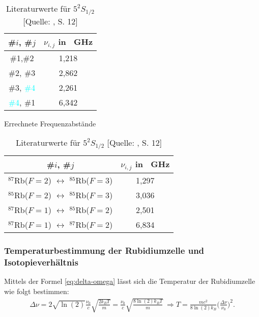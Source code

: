 \begin{table}[!h]
\begin{minipage}{7cm}
    \centering
    \begin{tabular}{|c|c|}
        \hline
        \#$i$, \#$j$       &       $\nu_{i,j}$ in \SI{}{\giga \hertz}      \\ 
        \hline
        \hline
        \textcolor{red!80!black}{\#1},\textcolor{green!50!black}{\#2}       &       1,218        \\  
        \hline
        \textcolor{green!50!black}{\#2}, \textcolor{pink!50!purple}{\#3}    &       2,862        \\ 
        \hline
        \textcolor{pink!50!purple}{\#3}, \textcolor{cyan}{\#4}              &       2,261        \\ 
        \hline
        \textcolor{cyan}{\#4}, \textcolor{red!80!black}{\#1}                &       6,342        \\ 
        \hline
    \end{tabular}
    \caption{Errechnete Frequenzabstände}
    \label{tab:plot-data00-rubidium}
\end{minipage}
\hskip0.5cm
\begin{minipage}{7cm}
    \begin{tabular}{|c|c|}
        \hline
        \#$i$, \#$j$       &       $\nu_{i,j}$ in \SI{}{\giga \hertz}      \\ 
        \hline
        \hline
        $^{87}$Rb($F = 2$) $\longleftrightarrow$ $^{85}$Rb($F = 3$)         &       1,297           \\  
        \hline
        $^{85}$Rb($F = 2$) $\longleftrightarrow$ $^{85}$Rb($F = 3$)         &       3,036           \\ 
        \hline
        $^{87}$Rb($F = 1$) $\longleftrightarrow$ $^{85}$Rb($F = 2$)         &       2,501           \\ 
        \hline
        $^{87}$Rb($F = 1$) $\longleftrightarrow$ $^{87}$Rb($F = 2$)         &       6,834           \\ 
        \hline
    \end{tabular}
    \caption{Literaturwerte für $5^{2}S_{1/2}$ [Quelle: \cite{H2}, S. 12]}
    \label{tab:lit-plot-data00-rubidium}
\end{minipage}
\end{table}

\subsubsection{Temperaturbestimmung der Rubidiumzelle und Isotopieverhältnis}
Mittels der Formel \eqref{eq:delta-omega} lässt sich die Temperatur der Rubidiumzelle wie folgt bestimmen:
\begin{align*}
    \Delta \nu = 2 \sqrt{\ln(2)} \frac{\nu_{0}}{c} \sqrt{\frac{2 k_{B} T}{m}} = \frac{\nu_{0}}{c} \sqrt{\frac{8 \ln(2) k_{B} T}{m}} \ \Rightarrow T = \frac{m c^2}{8 \ln(2) k_{B}} \biggl(\frac{\Delta \nu}{\nu_{0}} \biggr)^2.
\end{align*}

